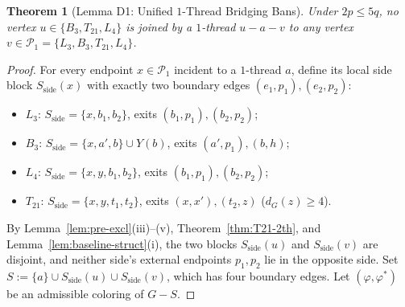 \documentclass[11pt,a4paper]{article}
\newtheorem{theorem}{Theorem}[section]
\theoremstyle{definition}
\newcommand{\Ppoor}{\mathcal{P}_1}
\begin{document}
\begin{theorem}[Lemma D1: Unified $1$-Thread Bridging Bans]\label{thm:bridge}
Under $2p \le 5q$, no vertex $u \in \{B_3, T_{21}, L_4\}$ is joined by a $1$-thread $u - a - v$ to any vertex $v \in \Ppoor = \{L_3, B_3, T_{21}, L_4\}$.
\end{theorem}

\begin{proof}
For every endpoint $x \in \Ppoor$ incident to a $1$-thread $a$, define its local side block $S_{\mathrm{side}}(x)$ with exactly two boundary edges $(e_1, p_1), (e_2, p_2)$:
\begin{itemize}[leftmargin=*,itemsep=1pt]
  \item $L_3$: $S_{\mathrm{side}} = \{x, b_1, b_2\}$, exits $(b_1, p_1), (b_2, p_2)$;
  \item $B_3$: $S_{\mathrm{side}} = \{x, a', b\} \cup Y(b)$, exits $(a', p_1), (b, h)$;
  \item $L_4$: $S_{\mathrm{side}} = \{x, y, b_1, b_2\}$, exits $(b_1, p_1), (b_2, p_2)$;
  \item $T_{21}$: $S_{\mathrm{side}} = \{x, y, t_1, t_2\}$, exits $(x, x'), (t_2, z)$ ($d_G(z) \ge 4$).
\end{itemize}
By Lemma~\ref{lem:pre-excl}(iii)--(v), Theorem~\ref{thm:T21-2th}, and Lemma~\ref{lem:baseline-struct}(i), the two blocks $S_{\mathrm{side}}(u)$ and $S_{\mathrm{side}}(v)$ are disjoint, and neither side's external endpoints $p_1, p_2$ lie in the opposite side. Set $S := \{a\} \cup S_{\mathrm{side}}(u) \cup S_{\mathrm{side}}(v)$, which has four boundary edges. Let $(\varphi, \varphi^*)$ be an admissible coloring of $G - S$.


\end{proof}
\end{document}
